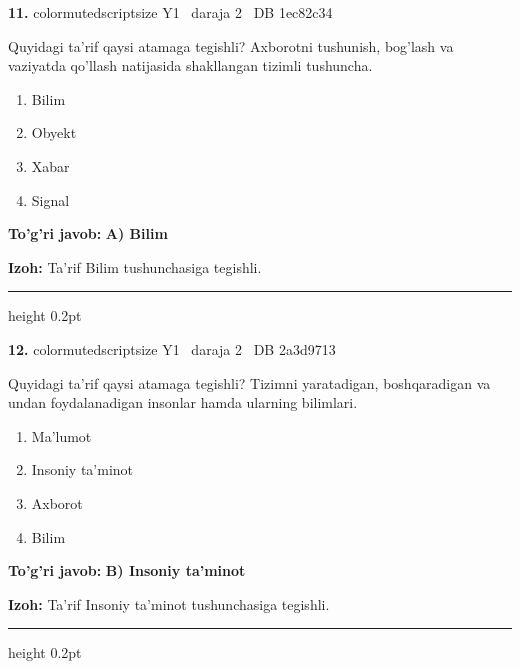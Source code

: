 \documentclass[10pt,a4paper,oneside]{article}
\begin{document}
\noindent\textbf{\color{ink}11.}  {color{muted}scriptsize Y1 \textbullet\ daraja 2 \textbullet\ DB 1ec82c34}
\par
Quyidagi ta'rif qaysi atamaga tegishli? Axborotni tushunish, bog'lash va vaziyatda qo'llash natijasida shakllangan tizimli tushuncha.
\begin{enumerate}[label=\Alph*),leftmargin=9mm]
\item Bilim
\item Obyekt
\item Xabar
\item Signal
\end{enumerate}
\begin{tcolorbox}[enhanced,breakable,colback=teal!4,colframe=teal!50!black,boxrule=0.5pt,arc=1.1mm,left=3mm,right=3mm,top=1.7mm,bottom=1.7mm,before skip=2mm,after skip=2mm]
\textbf{\color{teal}To'g'ri javob:} \textbf{A) Bilim}
\par\smallskip
\textbf{Izoh:} Ta'rif Bilim tushunchasiga tegishli.
\end{tcolorbox}
\vspace{2mm}\hrule height 0.2pt \vspace{3mm}

\noindent\textbf{\color{ink}12.}  {color{muted}scriptsize Y1 \textbullet\ daraja 2 \textbullet\ DB 2a3d9713}
\par
Quyidagi ta'rif qaysi atamaga tegishli? Tizimni yaratadigan, boshqaradigan va undan foydalanadigan insonlar hamda ularning bilimlari.
\begin{enumerate}[label=\Alph*),leftmargin=9mm]
\item Ma'lumot
\item Insoniy ta'minot
\item Axborot
\item Bilim
\end{enumerate}
\begin{tcolorbox}[enhanced,breakable,colback=teal!4,colframe=teal!50!black,boxrule=0.5pt,arc=1.1mm,left=3mm,right=3mm,top=1.7mm,bottom=1.7mm,before skip=2mm,after skip=2mm]
\textbf{\color{teal}To'g'ri javob:} \textbf{B) Insoniy ta'minot}
\par\smallskip
\textbf{Izoh:} Ta'rif Insoniy ta'minot tushunchasiga tegishli.
\end{tcolorbox}
\vspace{2mm}\hrule height 0.2pt \vspace{3mm}
\end{document}
